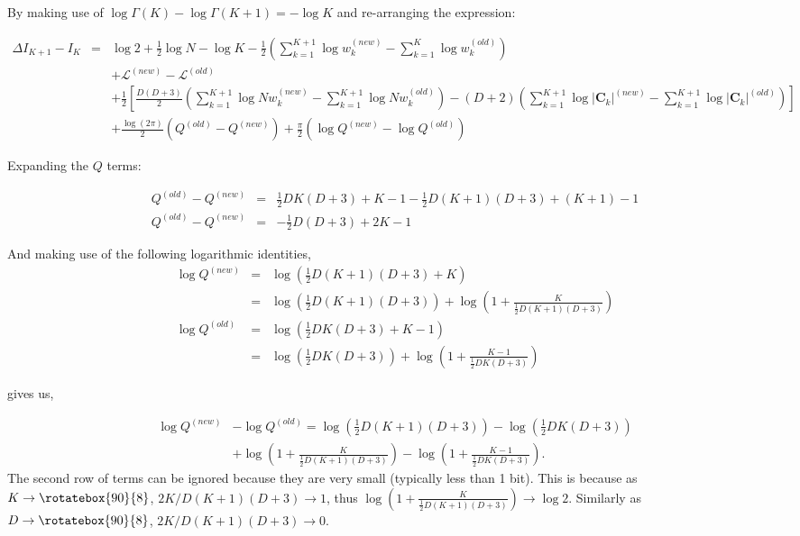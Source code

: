 \documentclass{elsarticle}
\newcommand{\vect}[1]{\boldsymbol{\mathbf{#1}}}
\def\infinity{\rotatebox{90}{8}}
\def\veccov{\vect{C}}
\begin{document}
\noindent{}By making use of $\log{\Gamma(K)} - \log{\Gamma(K + 1)} = -\log{K}$ and re-arranging the expression:

\begin{eqnarray}
\Delta{}I_{K+1} - I_K &=& \log{2} %
    + \frac{1}{2}\log{N} - \log{K} - \frac{1}{2}\left(\sum_{k=1}^{K+1}\log{w_k^{(new)}} - \sum_{k=1}^{K}\log{w_k^{(old)}}\right) \nonumber \\ %
&& + \mathcal{L}^{(new)} - \mathcal{L}^{(old)} \nonumber \\ %
&& + \frac{1}{2}\left[\frac{D(D+3)}{2}\left(\sum_{k=1}^{K+1}\log{Nw_k^{(new)} - \sum_{k=1}^{K+1}\log{Nw_k^{(old)}}} \right) - \left(D+2\right)\left(\sum_{k=1}^{K+1}\log{|\veccov_k|^{(new)}} - \sum_{k=1}^{K+1}\log{|\veccov_k|^{(old)}}\right)\right] \nonumber \\
&& + \frac{\log(2\pi)}{2}(Q^{(old)} - Q^{(new)}) + \frac{\pi}{2}\left(\log{Q^{(new)}} - \log{Q^{(old)}}\right)
\label{eq:13}
\end{eqnarray}

Expanding the $Q$ terms:

\begin{eqnarray}
Q^{(old)} - Q^{(new)} &=& \frac{1}{2}DK(D + 3) + K - 1 - \frac{1}{2}D(K + 1)(D + 3) + (K + 1) - 1 \nonumber \\
Q^{(old)} - Q^{(new)} &=& -\frac{1}{2}D(D+3) + 2K  - 1
\label{eq:14}
\end{eqnarray}

\noindent{}And making use of the following logarithmic identities,
\begin{eqnarray}
  \log{Q^{(new)}} &=& \log{\left(\frac{1}{2}D(K+1)(D + 3) + K\right)} \nonumber \\
                  &=& \log{\left(\frac{1}{2}D(K+1)(D + 3)\right)} + \log{\left(1 + \frac{K}{\frac{1}{2}D(K+1)(D + 3)}\right)} \\
  \log{Q^{(old)}} &=& \log{\left(\frac{1}{2}DK(D + 3) + K - 1\right)} \nonumber \\
                  &=& \log{\left(\frac{1}{2}DK(D + 3)\right)} + \log{\left(1 + \frac{K - 1}{\frac{1}{2}DK(D + 3)}\right)}
\end{eqnarray}


\noindent{}gives us,

\begin{eqnarray}
  \log{Q^{(new)}} &- \log{Q^{(old)}} = \log{\left(\frac{1}{2}D(K+1)(D + 3)\right)} - \log{\left(\frac{1}{2}DK(D + 3)\right)} \nonumber \\
                                    &+ \log{\left(1 + \frac{K}{\frac{1}{2}D(K+1)(D + 3)}\right)} - \log{\left(1 + \frac{K - 1}{\frac{1}{2}DK(D + 3)}\right)}.
\end{eqnarray}
The second row of terms can be ignored because they are very small (typically less than 1 bit). This is because as $K \rightarrow \infinity$, $2K/D(K+1)(D+3) \rightarrow 1$, thus $\log{\left(1 + \frac{K}{\frac{1}{2}D(K+1)(D + 3)}\right)} \rightarrow \log{2}$. Similarly as $D \rightarrow \infinity$, $2K/D(K+1)(D+3) \rightarrow 0$.
\end{document}
